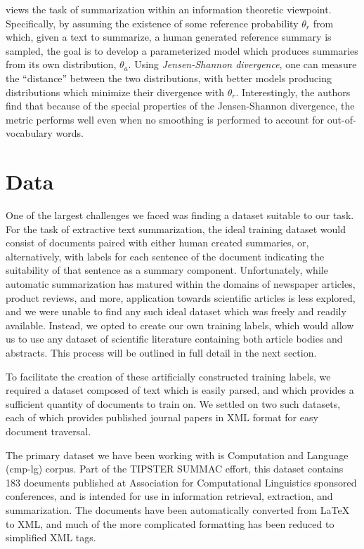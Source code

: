 \documentclass[11pt]{article}
\begin{document}
	\cite{lin2006} views the task of summarization within an information theoretic viewpoint. Specifically, by assuming the existence of some reference probability $\theta_{r}$ from which, given a text to summarize, a human generated reference summary is sampled, the goal is to develop a parameterized model which produces summaries from its own distribution, $\theta_{a}$. Using \emph{Jensen-Shannon divergence}, one can measure the ``distance'' between the two distributions, with better models producing distributions which minimize their divergence with $ \theta_{r}$. Interestingly, the authors find that because of the special properties of the Jensen-Shannon divergence, the metric performs well even when no smoothing is performed to account for out-of-vocabulary words.
	 

\section{Data} %
	One of the largest challenges we faced was finding a dataset suitable to our task. For the task of extractive text summarization, the ideal training dataset would consist of documents paired with either human created summaries, or, alternatively, with labels for each sentence of the document indicating the suitability of that sentence as a summary component. Unfortunately, while automatic summarization has matured within the domains of newspaper articles, product reviews, and more, application towards scientific articles is less explored, and we were unable to find any such ideal dataset which was freely and readily available. Instead, we opted to create our own training labels, which would allow us to use any dataset of scientific literature containing both article bodies and abstracts. This process will be outlined in full detail in the next section.

	To facilitate the creation of these artificially constructed training labels, we required a dataset composed of text which is easily parsed, and which provides a sufficient quantity of documents to train on. We settled on two such datasets, each of which provides published journal papers in XML format for easy document traversal.
	
	The primary dataset we have been working with is Computation and Language (cmp-lg) corpus. Part of the TIPSTER SUMMAC effort, this dataset contains 183 documents published at Association for Computational Linguistics sponsored conferences, and is intended for use in information retrieval, extraction, and summarization. The documents have been automatically converted from LaTeX to XML, and much of the more complicated formatting has been reduced to simplified XML tags.
	
\end{document}
